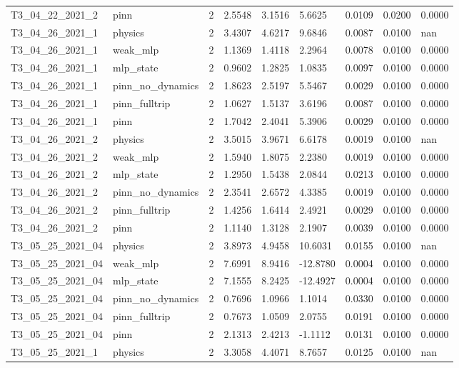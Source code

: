 \begin{table}[t]
\begin{tabular}{lllllllll}
T3\_04\_22\_2021\_2 & pinn & 2 & 2.5548 & 3.1516 & 5.6625 & 0.0109 & 0.0200 & 0.0000 \\
T3\_04\_26\_2021\_1 & physics & 2 & 3.4307 & 4.6217 & 9.6846 & 0.0087 & 0.0100 & nan \\
T3\_04\_26\_2021\_1 & weak\_mlp & 2 & 1.1369 & 1.4118 & 2.2964 & 0.0078 & 0.0100 & 0.0000 \\
T3\_04\_26\_2021\_1 & mlp\_state & 2 & 0.9602 & 1.2825 & 1.0835 & 0.0097 & 0.0100 & 0.0000 \\
T3\_04\_26\_2021\_1 & pinn\_no\_dynamics & 2 & 1.8623 & 2.5197 & 5.5467 & 0.0029 & 0.0100 & 0.0000 \\
T3\_04\_26\_2021\_1 & pinn\_fulltrip & 2 & 1.0627 & 1.5137 & 3.6196 & 0.0087 & 0.0100 & 0.0000 \\
T3\_04\_26\_2021\_1 & pinn & 2 & 1.7042 & 2.4041 & 5.3906 & 0.0029 & 0.0100 & 0.0000 \\
T3\_04\_26\_2021\_2 & physics & 2 & 3.5015 & 3.9671 & 6.6178 & 0.0019 & 0.0100 & nan \\
T3\_04\_26\_2021\_2 & weak\_mlp & 2 & 1.5940 & 1.8075 & 2.2380 & 0.0019 & 0.0100 & 0.0000 \\
T3\_04\_26\_2021\_2 & mlp\_state & 2 & 1.2950 & 1.5438 & 2.0844 & 0.0213 & 0.0100 & 0.0000 \\
T3\_04\_26\_2021\_2 & pinn\_no\_dynamics & 2 & 2.3541 & 2.6572 & 4.3385 & 0.0019 & 0.0100 & 0.0000 \\
T3\_04\_26\_2021\_2 & pinn\_fulltrip & 2 & 1.4256 & 1.6414 & 2.4921 & 0.0029 & 0.0100 & 0.0000 \\
T3\_04\_26\_2021\_2 & pinn & 2 & 1.1140 & 1.3128 & 2.1907 & 0.0039 & 0.0100 & 0.0000 \\
T3\_05\_25\_2021\_04 & physics & 2 & 3.8973 & 4.9458 & 10.6031 & 0.0155 & 0.0100 & nan \\
T3\_05\_25\_2021\_04 & weak\_mlp & 2 & 7.6991 & 8.9416 & -12.8780 & 0.0004 & 0.0100 & 0.0000 \\
T3\_05\_25\_2021\_04 & mlp\_state & 2 & 7.1555 & 8.2425 & -12.4927 & 0.0004 & 0.0100 & 0.0000 \\
T3\_05\_25\_2021\_04 & pinn\_no\_dynamics & 2 & 0.7696 & 1.0966 & 1.1014 & 0.0330 & 0.0100 & 0.0000 \\
T3\_05\_25\_2021\_04 & pinn\_fulltrip & 2 & 0.7673 & 1.0509 & 2.0755 & 0.0191 & 0.0100 & 0.0000 \\
T3\_05\_25\_2021\_04 & pinn & 2 & 2.1313 & 2.4213 & -1.1112 & 0.0131 & 0.0100 & 0.0000 \\
T3\_05\_25\_2021\_1 & physics & 2 & 3.3058 & 4.4071 & 8.7657 & 0.0125 & 0.0100 & nan \\

\end{tabular}
\end{table}
